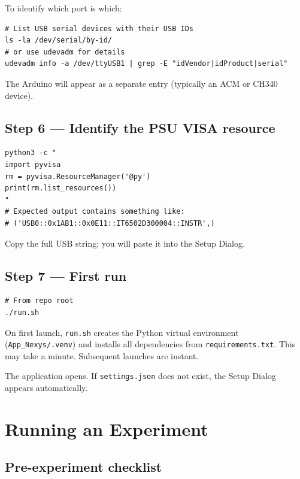 \documentclass[12pt, a4paper]{report}
\begin{document}
To identify which port is which:

\begin{lstlisting}[style=shell]
# List USB serial devices with their USB IDs
ls -la /dev/serial/by-id/
# or use udevadm for details
udevadm info -a /dev/ttyUSB1 | grep -E "idVendor|idProduct|serial"
\end{lstlisting}

The Arduino will appear as a separate entry (typically an ACM or CH340 device).

\section{Step 6 --- Identify the PSU VISA resource}

\begin{lstlisting}[style=shell]
python3 -c "
import pyvisa
rm = pyvisa.ResourceManager('@py')
print(rm.list_resources())
"
# Expected output contains something like:
# ('USB0::0x1AB1::0x0E11::IT6502D300004::INSTR',)
\end{lstlisting}

Copy the full USB string; you will paste it into the Setup Dialog.

\section{Step 7 --- First run}

\begin{lstlisting}[style=shell]
# From repo root
./run.sh
\end{lstlisting}

On first launch, \texttt{run.sh} creates the Python virtual environment
(\texttt{App\_Nexys/.venv}) and installs all dependencies from \texttt{requirements.txt}.
This may take a minute. Subsequent launches are instant.

The application opens. If \texttt{settings.json} does not exist, the Setup Dialog
appears automatically.

\chapter{Running an Experiment}
\label{ch:running}

\section{Pre-experiment checklist}
\end{document}
